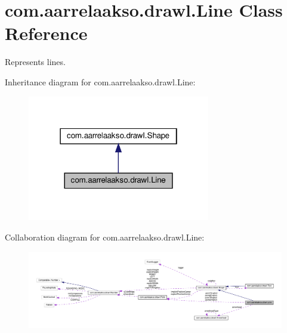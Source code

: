 \hypertarget{classcom_1_1aarrelaakso_1_1drawl_1_1_line}{}\section{com.\+aarrelaakso.\+drawl.\+Line Class Reference}
\label{classcom_1_1aarrelaakso_1_1drawl_1_1_line}


Represents lines.  




Inheritance diagram for com.\+aarrelaakso.\+drawl.\+Line\+:\nopagebreak
\begin{figure}[H]
\begin{center}
\leavevmode
\includegraphics[width=226pt]{d0/d9b/classcom_1_1aarrelaakso_1_1drawl_1_1_line__inherit__graph}
\end{center}
\end{figure}


Collaboration diagram for com.\+aarrelaakso.\+drawl.\+Line\+:\nopagebreak
\begin{figure}[H]
\begin{center}
\leavevmode
\includegraphics[width=350pt]{d4/d48/classcom_1_1aarrelaakso_1_1drawl_1_1_line__coll__graph}
\end{center}
\end{figure}

